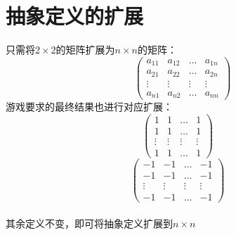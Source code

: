 \documentclass[UTF-8,a4paper]{ctexart}
\begin{document}
\section{抽象定义的扩展}
只需将\(2 \times 2\)的矩阵扩展为\(n \times n\)的矩阵：
\[\begin{pmatrix}
    a_{11}&a_{12}&\dots&a_{1n}
    \\a_{21}&a_{22}&\dots&a_{2n}
    \\ \vdots &\vdots &\vdots &\vdots
    \\a_{n1}&a_{n2}&\dots&a_{nn}
\end{pmatrix}\]
游戏要求的最终结果也进行对应扩展：
\[\begin{pmatrix}
    1&1&\dots&1
    \\1&1&\dots&1
    \\ \vdots &\vdots &\vdots &\vdots
    \\1&1&\dots&1
\end{pmatrix}
\quad
\]
\[\begin{pmatrix}
    -1&-1&\dots&-1
    \\-1&-1&\dots&-1
    \\ \vdots &\vdots &\vdots &\vdots
    \\-1&-1&\dots&-1
\end{pmatrix}
\quad
\]
\\其余定义不变，即可将抽象定义扩展到\(n \times n\)
\end{document}

